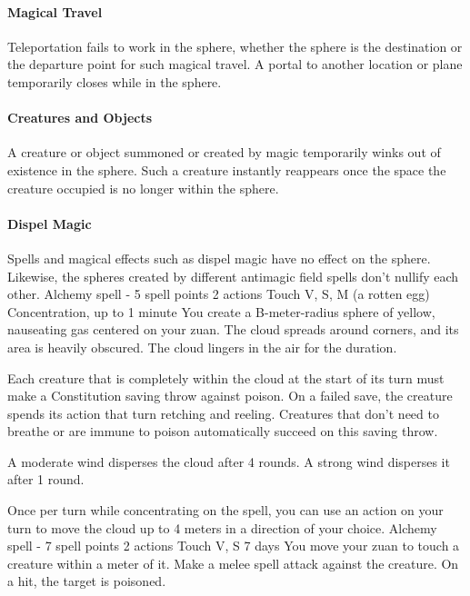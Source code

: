         \paragraph{Magical Travel}
        Teleportation fails to work in the sphere, whether the sphere is the destination or the departure point for such magical travel.
        A portal to another location or plane  temporarily closes while in the sphere.

        \paragraph{Creatures and Objects}
        A creature or object summoned or created by magic temporarily winks out of existence in the sphere.
        Such a creature instantly reappears once the space the creature occupied is no longer within the sphere.

        \paragraph{Dispel Magic}
        Spells and magical effects such as dispel magic have no effect on the sphere.
        Likewise, the spheres created by different antimagic field spells don't nullify each other.
        {Alchemy spell - 5 spell points}
        {2 actions}
        {Touch}
        {V, S, M (a rotten egg)}
        {Concentration, up to 1 minute}
        You create a B-meter-radius sphere of yellow, nauseating gas centered on your zuan.
        The cloud spreads around corners, and its area is heavily obscured.
        The cloud lingers in the air for the duration.

        Each creature that is completely within the cloud at the start of its turn must make a Constitution saving throw against poison.
        On a failed save, the creature spends its action that turn retching and reeling.
        Creatures that don't need to breathe or are immune to poison automatically succeed on this saving throw.

        A moderate wind disperses the cloud after 4 rounds.
        A strong wind disperses it after 1 round.

        Once per turn while concentrating on the spell, you can use an action on your turn to move the cloud up to 4 meters in a direction of your choice.
        {Alchemy spell - 7 spell points}
        {2 actions}
        {Touch}
        {V, S}
        {7 days}
        You move your zuan to touch a creature within a meter of it.
        Make a melee spell attack against the creature.
        On a hit, the target is poisoned.


